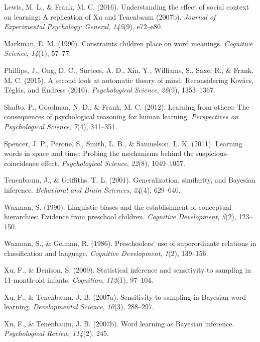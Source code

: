 \documentclass[english,floatsintext,man]{apa6}
\theoremstyle{definition}
\theoremstyle{definition}
\theoremstyle{remark}
\begin{document}
\hypertarget{ref-lewis2016understanding}{}
Lewis, M. L., \& Frank, M. C. (2016). Understanding the effect of social
context on learning: A replication of Xu and Tenenbaum (2007b).
\emph{Journal of Experimental Psychology: General}, \emph{145}(9),
e72--e80.

\hypertarget{ref-markman1990constraints}{}
Markman, E. M. (1990). Constraints children place on word meanings.
\emph{Cognitive Science}, \emph{14}(1), 57--77.

\hypertarget{ref-phillips2015second}{}
Phillips, J., Ong, D. C., Surtees, A. D., Xin, Y., Williams, S., Saxe,
R., \& Frank, M. C. (2015). A second look at automatic theory of mind:
Reconsidering Kovács, Téglás, and Endress (2010). \emph{Psychological
Science}, \emph{26}(9), 1353--1367.

\hypertarget{ref-shafto2012}{}
Shafto, P., Goodman, N. D., \& Frank, M. C. (2012). Learning from
others: The consequences of psychological reasoning for human learning.
\emph{Perspectives on Psychological Science}, \emph{7}(4), 341--351.

\hypertarget{ref-spencer2011learning}{}
Spencer, J. P., Perone, S., Smith, L. B., \& Samuelson, L. K. (2011).
Learning words in space and time: Probing the mechanisms behind the
suspicious-coincidence effect. \emph{Psychological Science},
\emph{22}(8), 1049--1057.

\hypertarget{ref-tenenbaum2001}{}
Tenenbaum, J., \& Griffiths, T. L. (2001). Generalization, similarity,
and Bayesian inference. \emph{Behavioral and Brain Sciences},
\emph{24}(4), 629--640.

\hypertarget{ref-waxman1990}{}
Waxman, S. (1990). Linguistic biases and the establishment of conceptual
hierarchies: Evidence from preschool children. \emph{Cognitive
Development}, \emph{5}(2), 123--150.

\hypertarget{ref-waxman1986}{}
Waxman, S., \& Gelman, R. (1986). Preschoolers' use of superordinate
relations in classification and language. \emph{Cognitive Development},
\emph{1}(2), 139--156.

\hypertarget{ref-xu2009}{}
Xu, F., \& Denison, S. (2009). Statistical inference and sensitivity to
sampling in 11-month-old infants. \emph{Cognition}, \emph{112}(1),
97--104.

\hypertarget{ref-xu2007b}{}
Xu, F., \& Tenenbaum, J. B. (2007a). Sensitivity to sampling in Bayesian
word learning. \emph{Developmental Science}, \emph{10}(3), 288--297.

\hypertarget{ref-xu2007word}{}
Xu, F., \& Tenenbaum, J. B. (2007b). Word learning as Bayesian
inference. \emph{Psychological Review}, \emph{114}(2), 245.
\end{document}
